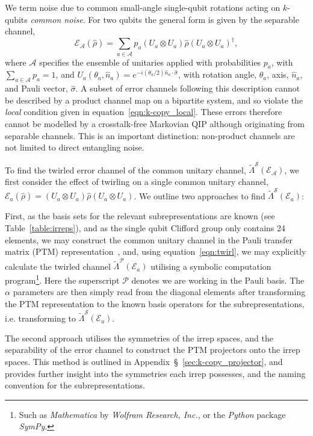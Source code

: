 We term noise due to common small-angle single-qubit rotations acting on $k$-qubits \emph{common noise}. For two qubits the general form is given by the separable channel,
\begin{equation}\label{eqn:rotation_channel}
    \mathcal{E}_\mathcal{A}(\hat\rho)=\sum_{a\in \mathcal{A}} p_a(U_a\otimes U_a)\hat\rho(U_a\otimes U_a)^\dagger,
\end{equation}
where $\mathcal{A}$ specifies the ensemble of unitaries applied with probabilities $p_a$, with $\sum_{a \in\mathcal{A}}p_a=1$, and $U_a(\theta_a,\hat{n}_a)=e^{-i(\theta_a/2)\hat n_a\cdot\hat\sigma}$, with rotation angle, $\theta_a$, axis, $\hat n_a$, and Pauli vector, $\hat\sigma$.
A subset of error channels following this description cannot be described by a product channel map on a bipartite system, and so violate the \emph{local} condition given in equation~\ref{eqn:k-copy_local}. These errors therefore cannot be modelled by a crosstalk-free Markovian QIP although originating from separable channels.
This is an important distinction: non-product channels are not limited to direct entangling noise.

To find the twirled error channel of the common unitary channel, $\tilde\Lambda^\mathcal{S}(\mathcal{E}_\mathcal{A})$, we first consider the effect of twirling on a single common unitary channel, $\mathcal{E}_a(\hat\rho) = (U_a\otimes U_a)\hat\rho(U_a\otimes U_a)$. We outline two approaches to find $\tilde\Lambda^\mathcal{S}(\mathcal{E}_a)$:

First, as the basis sets for the relevant
subrepresentations are known (see Table~\ref{table:irreps}), and as the single qubit
Clifford group only contains 24 elements, we may construct the common unitary
channel in the Pauli transfer matrix (PTM) representation~\cite{hashim_practical_2025,gilchrist_vectorization_2009},  and, using equation~\ref{eqn:twirl}, we may explicitly calculate the twirled channel
$\tilde\Lambda^\mathcal{P}(\mathcal{E}_a)$ utilising a symbolic computation
program\footnote{Such as \emph{Mathematica} by \emph{Wolfram Research, Inc.}, or the \emph{Python} package \emph{SymPy}.}. Here the superscript $\mathcal{P}$ denotes we are working in the Pauli basis.
The $\alpha$ parameters are then simply read from the diagonal elements after transforming the PTM representation to the known basis operators for the subrepresentations, i.e. transforming to $\tilde\Lambda^\mathcal{S}(\mathcal{E}_a)$.

The second approach utilises the symmetries of the irrep spaces, and the separability of the error channel to construct the PTM projectors onto the irrep spaces. This method is outlined in Appendix~\S~\ref{sec:k-copy_projector}, and provides further insight into the symmetries each irrep possesses, and the naming convention for the subrepresentations.

